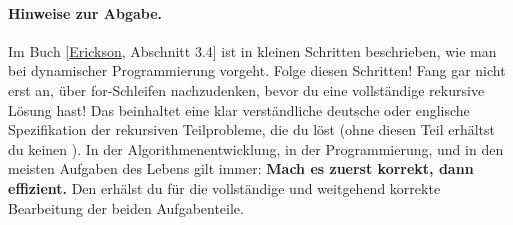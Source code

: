 \documentclass{uebung_cs}
\begin{document}
\paragraph{Hinweise zur Abgabe.}
Im Buch [\href{https://jeffe.cs.illinois.edu/teaching/algorithms/book/Algorithms-JeffE.pdf}{Erickson}, Abschnitt 3.4] ist in kleinen Schritten beschrieben, wie man bei dynamischer Programmierung vorgeht.
Folge diesen Schritten!
Fang gar nicht erst an, über for-Schleifen nachzudenken, bevor du eine vollständige rekursive Lösung hast! Das beinhaltet eine klar verständliche deutsche oder englische Spezifikation der rekursiven Teilprobleme, die du löst (ohne diesen Teil erhältst du keinen ).
In der Algorithmenentwicklung, in der Programmierung, und in den meisten Aufgaben des Lebens gilt immer: \textbf{Mach es zuerst korrekt, dann effizient.}
Den  erhälst du für die vollständige und weitgehend korrekte Bearbeitung der beiden Aufgabenteile.

%
\end{document}
